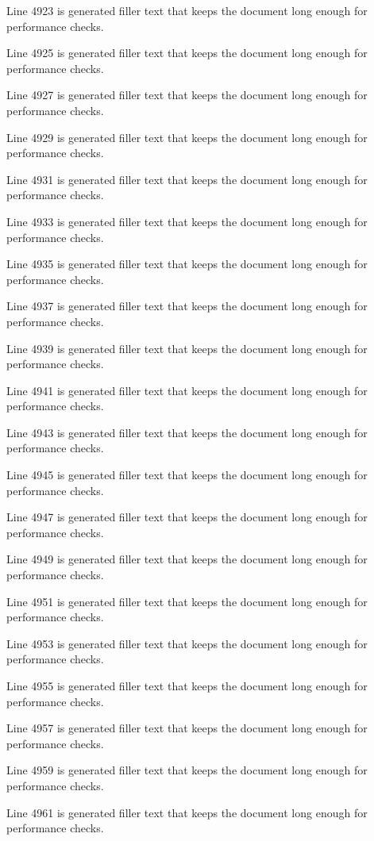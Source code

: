 Line 4923 is generated filler text that keeps the document long enough for performance checks.

Line 4925 is generated filler text that keeps the document long enough for performance checks.

Line 4927 is generated filler text that keeps the document long enough for performance checks.

Line 4929 is generated filler text that keeps the document long enough for performance checks.

Line 4931 is generated filler text that keeps the document long enough for performance checks.

Line 4933 is generated filler text that keeps the document long enough for performance checks.

Line 4935 is generated filler text that keeps the document long enough for performance checks.

Line 4937 is generated filler text that keeps the document long enough for performance checks.

Line 4939 is generated filler text that keeps the document long enough for performance checks.

Line 4941 is generated filler text that keeps the document long enough for performance checks.

Line 4943 is generated filler text that keeps the document long enough for performance checks.

Line 4945 is generated filler text that keeps the document long enough for performance checks.

Line 4947 is generated filler text that keeps the document long enough for performance checks.

Line 4949 is generated filler text that keeps the document long enough for performance checks.

Line 4951 is generated filler text that keeps the document long enough for performance checks.

Line 4953 is generated filler text that keeps the document long enough for performance checks.

Line 4955 is generated filler text that keeps the document long enough for performance checks.

Line 4957 is generated filler text that keeps the document long enough for performance checks.

Line 4959 is generated filler text that keeps the document long enough for performance checks.

Line 4961 is generated filler text that keeps the document long enough for performance checks.

